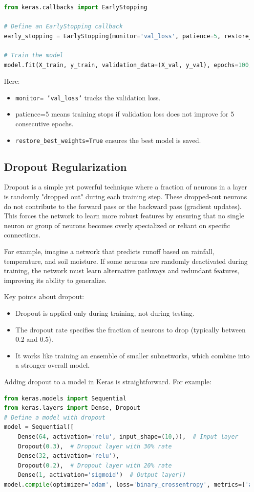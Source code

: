 \begin{lstlisting}[language=Python]
from keras.callbacks import EarlyStopping

# Define an EarlyStopping callback
early_stopping = EarlyStopping(monitor='val_loss', patience=5, restore_best_weights=True)

# Train the model 
model.fit(X_train, y_train, validation_data=(X_val, y_val), epochs=100, callbacks=[early_stopping])

\end{lstlisting}
Here:
\begin{itemize}
    \item \texttt{monitor= 'val\_loss'} tracks the validation loss.
    \item patience=5 means training stops if validation loss does not improve for 5 consecutive epochs.
    \item \texttt{restore\_best\_weights=True} ensures the best model is saved.
\end{itemize}

\subsection{Dropout Regularization}
Dropout is a simple yet powerful technique where a fraction of neurons in a layer is randomly "dropped out" during each training step. These dropped-out neurons do not contribute to the forward pass or the backward pass (gradient updates). This forces the network to learn more robust features by ensuring that no single neuron or group of neurons becomes overly specialized or reliant on specific connections.

For example, imagine a network that predicts runoff based on rainfall, temperature, and soil moisture. If some neurons are randomly deactivated during training, the network must learn alternative pathways and redundant features, improving its ability to generalize.

Key points about dropout:

\begin{itemize}
    \item Dropout is applied only during training, not during testing.
    \item The dropout rate specifies the fraction of neurons to drop (typically between 0.2 and 0.5).
    \item It works like training an ensemble of smaller subnetworks, which combine into a stronger overall model.
\end{itemize}
Adding dropout to a model in Keras is straightforward. For example:
\begin{lstlisting}[language=Python]
from keras.models import Sequential
from keras.layers import Dense, Dropout
# Define a model with dropout
model = Sequential([
    Dense(64, activation='relu', input_shape=(10,)),  # Input layer
    Dropout(0.3),  # Dropout layer with 30% rate
    Dense(32, activation='relu'),
    Dropout(0.2),  # Dropout layer with 20% rate
    Dense(1, activation='sigmoid')  # Output layer])
model.compile(optimizer='adam', loss='binary_crossentropy', metrics=['accuracy'])
\end{lstlisting}

